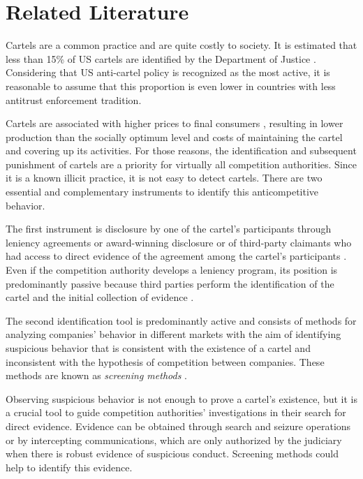 \section{Related Literature}
\label{sec:literature}

Cartels are a common practice and are quite costly to society. It is estimated that less than 15\% of US cartels are identified by the Department of Justice \citep{bryant1991price}. Considering that US anti-cartel policy is recognized as the most active, it is reasonable to assume that this proportion is even lower in countries with less antitrust enforcement tradition.

Cartels are associated with higher prices to final consumers \citep{connor2007price}, resulting in lower production than the socially optimum level and costs of maintaining the cartel and covering up its activities. For those reasons, the identification and subsequent punishment of cartels are a priority for virtually all competition authorities. Since it is a known illicit practice, it is not easy to detect cartels. There are two essential and complementary instruments to identify this anticompetitive behavior.

The first instrument is disclosure by one of the cartel's participants through leniency agreements or award-winning disclosure or of third-party claimants who had access to direct evidence of the agreement among the cartel's participants \citep{wils2007leniency}. Even if the competition authority develops a leniency program, its position is predominantly passive because third parties perform the identification of the cartel and the initial collection of evidence \citep{wils2016leniency}.

The second identification tool is predominantly active and consists of methods for analyzing companies' behavior in different markets with the aim of identifying suspicious behavior that is consistent with the existence of a cartel and inconsistent with the hypothesis of competition between companies. These methods are known as \textit{screening methods} \citep{harrington2008detecting}.

Observing suspicious behavior is not enough to prove a cartel's existence, but it is a crucial tool to guide competition authorities' investigations in their search for direct evidence. Evidence can be obtained through search and seizure operations or by intercepting communications, which are only authorized by the judiciary when there is robust evidence of suspicious conduct. Screening methods could help to identify this evidence.

